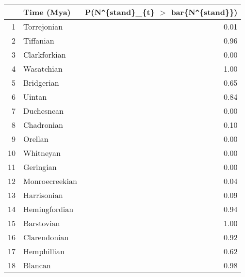 \begin{table}[ht]
\centering
\begin{tabular}{rlr}
  \hline
 & Time (Mya) & P(N\verb|^|\{stand\}\_\{t\} $>$ bar\{N\verb|^|\{stand\}\}) \\ 
  \hline
1 & Torrejonian & 0.01 \\ 
  2 & Tiffanian & 0.96 \\ 
  3 & Clarkforkian & 0.00 \\ 
  4 & Wasatchian & 1.00 \\ 
  5 & Bridgerian & 0.65 \\ 
  6 & Uintan & 0.84 \\ 
  7 & Duchesnean & 0.00 \\ 
  8 & Chadronian & 0.10 \\ 
  9 & Orellan & 0.00 \\ 
  10 & Whitneyan & 0.00 \\ 
  11 & Geringian & 0.00 \\ 
  12 & Monroecreekian & 0.04 \\ 
  13 & Harrisonian & 0.09 \\ 
  14 & Hemingfordian & 0.94 \\ 
  15 & Barstovian & 1.00 \\ 
  16 & Clarendonian & 0.92 \\ 
  17 & Hemphillian & 0.62 \\ 
  18 & Blancan & 0.98 \\ 
   \hline
\end{tabular}
\label{tab:div_peak}
\end{table}

